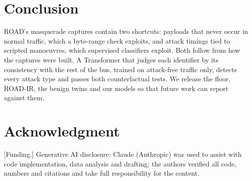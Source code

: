 \documentclass[conference]{IEEEtran}
\begin{document}
\section{Conclusion}
ROAD's masquerade captures contain two shortcuts: payloads that never occur in normal traffic, which a byte-range check exploits, and attack timings tied to scripted manoeuvres, which supervised classifiers exploit. Both follow from how the captures were built. A Transformer that judges each identifier by its consistency with the rest of the bus, trained on attack-free traffic only, detects every attack type and passes both counterfactual tests. We release the floor, ROAD-IR, the benign twins and our models so that future work can report against them.

\section*{Acknowledgment}
[Funding.] Generative AI disclosure: Claude (Anthropic) was used to assist with code implementation, data analysis and drafting; the authors verified all code, numbers and citations and take full responsibility for the content.
\end{document}
